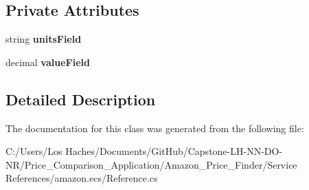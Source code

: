 \subsection*{Private Attributes}
\begin{DoxyCompactItemize}
\item 
\hypertarget{class_price___comparison_1_1amazon_1_1ecs_1_1_decimal_with_units_a6f32faf0f64ac03e31ba5bcfb23eda8e}{string {\bfseries units\-Field}}\label{class_price___comparison_1_1amazon_1_1ecs_1_1_decimal_with_units_a6f32faf0f64ac03e31ba5bcfb23eda8e}

\item 
\hypertarget{class_price___comparison_1_1amazon_1_1ecs_1_1_decimal_with_units_a0a2c499f97358dd547a64d81937b8496}{decimal {\bfseries value\-Field}}\label{class_price___comparison_1_1amazon_1_1ecs_1_1_decimal_with_units_a0a2c499f97358dd547a64d81937b8496}

\end{DoxyCompactItemize}


\subsection{Detailed Description}


The documentation for this class was generated from the following file\-:\begin{DoxyCompactItemize}
\item 
C\-:/\-Users/\-Los Haches/\-Documents/\-Git\-Hub/\-Capstone-\/\-L\-H-\/\-N\-N-\/\-D\-O-\/\-N\-R/\-Price\-\_\-\-Comparison\-\_\-\-Application/\-Amazon\-\_\-\-Price\-\_\-\-Finder/\-Service References/amazon.\-ecs/Reference.\-cs\end{DoxyCompactItemize}
